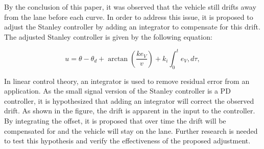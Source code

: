 \documentclass[arbeit=studie,oneside,BCOR=12mm]{ArbeitRST}
\begin{document}
By the conclusion of this paper, it was observed that the vehicle still drifts
away from the lane before each curve. In order to address this issue, it is
proposed to adjust the Stanley controller by adding an integrator to compensate
for this drift. The adjusted Stanley controller is given by the following
equation:

\begin{equation}
u = \theta - \theta_d + \arctan\left(\frac{ke_{V}}{v}\right) + k_{i} \int_{0}^{t} e_{V},d\tau,
\label{eq:Stanley-Regler-adjusted}
\end{equation}

In linear control theory, an integrator is used to remove residual error from
an application. As the small signal version of the Stanley controller is a PD
controller, it is hypothesized that adding an integrator will correct the
observed drift. As shown in the figure, the drift is apparent in the input to
the controller. By integrating the offset, it is proposed that over time the
drift will be compensated for and the vehicle will stay on the lane. Further
research is needed to test this hypothesis and verify the effectiveness of the
proposed adjustment.

\iffalse
By the conclusion of this paper, the vehicle still drifts away from the
lane before each curve. In the future, it is proposed to adjust the Stanley
controller to include an integrator in order to compensate for this drift.
The adjusted Stanley controller has the form of the following equation:

\begin{equation} 
    u = \theta - \theta_d + \arctan\left(\frac{ke_{fa}}{v}\right) + k_{i} \int_{0}^{\infty} e_{fa}\,dt, 
    \label{eq:Stanley-Regler-adjusted} 
\end{equation}

In linear control theory, an integrator is used in order to remove residual
error from an application. As the small signal version of the Stanley
controller is a PD controller, it is hypothesized that an integrator will 
correct this observed drift. As can be seen in FIGURE, the drift is apparent in
the input to the controller. By integrating the offset it is proposed that
over time the drift will be componsated for and the vehicle stay on the lane. 
\fi
\end{document}
